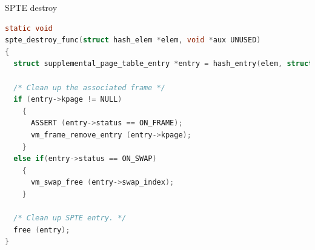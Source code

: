 \documentclass[10pt]{beamer}
\begin{document}
\begin{frame}[fragile]{SPTE destroy}
\begin{lstlisting}[language=C]
static void
spte_destroy_func(struct hash_elem *elem, void *aux UNUSED)
{
  struct supplemental_page_table_entry *entry = hash_entry(elem, struct supplemental_page_table_entry, elem);

  /* Clean up the associated frame */
  if (entry->kpage != NULL) 
    {
      ASSERT (entry->status == ON_FRAME);
      vm_frame_remove_entry (entry->kpage);
    }
  else if(entry->status == ON_SWAP) 
    {
      vm_swap_free (entry->swap_index);
    }

  /* Clean up SPTE entry. */
  free (entry);
}

\end{lstlisting}
\end{frame}
\end{document}

